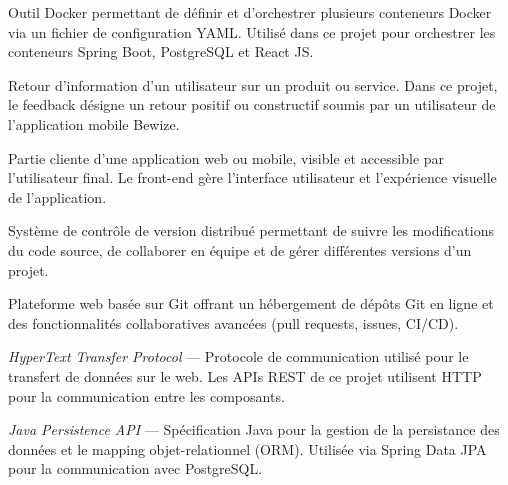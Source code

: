 \begin{description}[leftmargin=4cm, labelwidth=3.5cm]
    \vspace{0.3cm}

    \item[\textbf{docker-compose}] Outil Docker permettant de définir 
    et d'orchestrer plusieurs conteneurs Docker via un fichier de 
    configuration YAML. Utilisé dans ce projet pour orchestrer 
    les conteneurs Spring Boot, PostgreSQL et React JS.

    \vspace{0.3cm}

    \item[\textbf{Feedback}] Retour d'information d'un utilisateur 
    sur un produit ou service. Dans ce projet, le feedback désigne 
    un retour positif ou constructif soumis par un utilisateur 
    de l'application mobile Bewize.

    \vspace{0.3cm}

    \item[\textbf{Front-end}] Partie cliente d'une application web 
    ou mobile, visible et accessible par l'utilisateur final. 
    Le front-end gère l'interface utilisateur et l'expérience 
    visuelle de l'application.

    \vspace{0.3cm}

    \item[\textbf{Git}] Système de contrôle de version distribué 
    permettant de suivre les modifications du code source, de 
    collaborer en équipe et de gérer différentes versions d'un projet.

    \vspace{0.3cm}

    \item[\textbf{GitHub}] Plateforme web basée sur Git offrant 
    un hébergement de dépôts Git en ligne et des fonctionnalités 
    collaboratives avancées (pull requests, issues, CI/CD).

    \vspace{0.3cm}

    \item[\textbf{HTTP}] \textit{HyperText Transfer Protocol} — 
    Protocole de communication utilisé pour le transfert de données 
    sur le web. Les APIs REST de ce projet utilisent HTTP pour 
    la communication entre les composants.

    \vspace{0.3cm}

    \item[\textbf{JPA}] \textit{Java Persistence API} — Spécification 
    Java pour la gestion de la persistance des données et le mapping 
    objet-relationnel (ORM). Utilisée via Spring Data JPA pour 
    la communication avec PostgreSQL.


\end{description}
